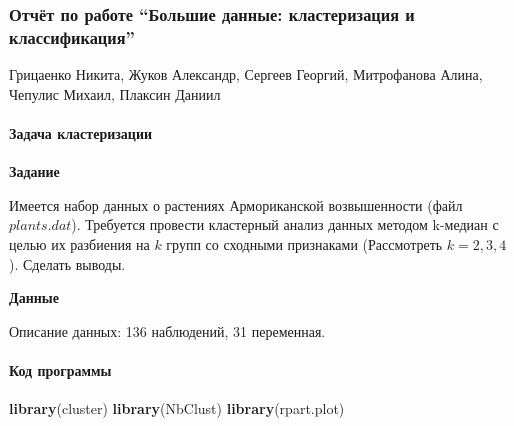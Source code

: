 \documentclass[
]{article}
\author{}
\date{\vspace{-2.5em}}
\newenvironment{Shaded}{\begin{snugshade}}{\end{snugshade}}
\newcommand{\KeywordTok}[1]{\textcolor[rgb]{0.13,0.29,0.53}{\textbf{#1}}}
\newcommand{\NormalTok}[1]{#1}
\begin{document}
\hypertarget{ux43eux442ux447ux451ux442-ux43fux43e-ux440ux430ux431ux43eux442ux435-ux431ux43eux43bux44cux448ux438ux435-ux434ux430ux43dux43dux44bux435-ux43aux43bux430ux441ux442ux435ux440ux438ux437ux430ux446ux438ux44f-ux438-ux43aux43bux430ux441ux441ux438ux444ux438ux43aux430ux446ux438ux44f}{%
\subsubsection{\texorpdfstring{\textbf{Отчёт по работе ``Большие данные:
кластеризация и
классификация''}}{Отчёт по работе ``Большие данные: кластеризация и классификация''}}\label{ux43eux442ux447ux451ux442-ux43fux43e-ux440ux430ux431ux43eux442ux435-ux431ux43eux43bux44cux448ux438ux435-ux434ux430ux43dux43dux44bux435-ux43aux43bux430ux441ux442ux435ux440ux438ux437ux430ux446ux438ux44f-ux438-ux43aux43bux430ux441ux441ux438ux444ux438ux43aux430ux446ux438ux44f}}

Грицаенко Никита, Жуков Александр, Сергеев Георгий, Митрофанова Алина,
Чепулис Михаил, Плаксин Даниил

\hypertarget{ux437ux430ux434ux430ux447ux430-ux43aux43bux430ux441ux442ux435ux440ux438ux437ux430ux446ux438ux438}{%
\paragraph{\texorpdfstring{\textbf{Задача
кластеризации}}{Задача кластеризации}}\label{ux437ux430ux434ux430ux447ux430-ux43aux43bux430ux441ux442ux435ux440ux438ux437ux430ux446ux438ux438}}

\textbf{Задание}

Имеется набор данных о растениях Армориканской возвышенности (файл
\(plants.dat\)). Требуется провести кластерный анализ данных методом
k-медиан с целью их разбиения на \(k\) групп со сходными признаками
(Рассмотреть \(k=2,3,4\)). Сделать выводы.

\textbf{Данные}

Описание данных: 136 наблюдений, 31 переменная.

\hypertarget{ux43aux43eux434-ux43fux440ux43eux433ux440ux430ux43cux43cux44b}{%
\paragraph{\texorpdfstring{\textbf{Код
программы}}{Код программы}}\label{ux43aux43eux434-ux43fux440ux43eux433ux440ux430ux43cux43cux44b}}

\begin{Shaded}
\begin{Highlighting}[]
\KeywordTok{library}\NormalTok{(cluster)}
\KeywordTok{library}\NormalTok{(NbClust)}
\KeywordTok{library}\NormalTok{(rpart.plot)}
\end{Highlighting}
\end{Shaded}
\end{document}
